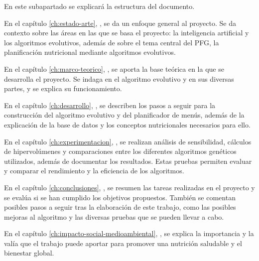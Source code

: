 En este subapartado se explicará la estructura del documento.

En el capítulo \ref{ch:estado-arte}, , se da un enfoque general al proyecto. Se da contexto sobre las áreas en las que se basa el proyecto: la inteligencia artificial y los algoritmos evolutivos, además de sobre el tema central del PFG, la planificación nutricional mediante algoritmos evolutivos.

En el capítulo \ref{ch:marco-teorico}, , se aporta la base teórica en la que se desarrolla el proyecto. Se indaga en el algoritmo evolutivo y en sus diversas partes, y se explica su funcionamiento.

En el capítulo \ref{ch:desarrollo}, , se describen los pasos a seguir para la construcción del algoritmo evolutivo y del planificador de menús, además de la explicación de la base de datos y los conceptos nutricionales necesarios para ello.

En el capítulo \ref{ch:experimentacion}, , se realizan análisis de sensibilidad, cálculos de hipervolúmenes y comparaciones entre los diferentes algoritmos genéticos utilizados, además de documentar los resultados. Estas pruebas permiten evaluar y comparar el rendimiento y la eficiencia de los algoritmos.

En el capítulo \ref{ch:conclusiones}, , se resumen las tareas realizadas en el proyecto y se evalúa si se han cumplido los objetivos propuestos. También se comentan posibles pasos a seguir tras la elaboración de este trabajo, como las posibles mejoras al algoritmo y las diversas pruebas que se pueden llevar a cabo.

En el capítulo \ref{ch:impacto-social-medioambiental}, , se explica la importancia y la valía que el trabajo puede aportar para promover una nutrición saludable y el bienestar global. 